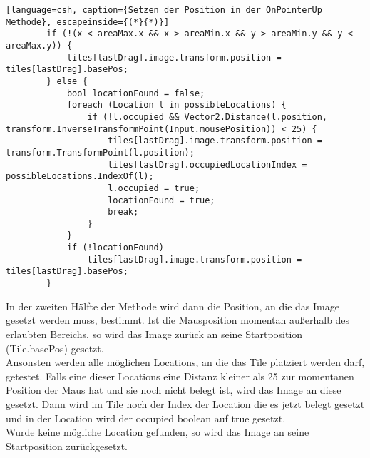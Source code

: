{\begin{lstlisting}[language=csh, caption={Setzen der Position in der OnPointerUp Methode}, escapeinside={(*}{*)}]
        if (!(x < areaMax.x && x > areaMin.x && y > areaMin.y && y < areaMax.y)) {
            tiles[lastDrag].image.transform.position = tiles[lastDrag].basePos;
        } else {
            bool locationFound = false;
            foreach (Location l in possibleLocations) {
                if (!l.occupied && Vector2.Distance(l.position, transform.InverseTransformPoint(Input.mousePosition)) < 25) {
                    tiles[lastDrag].image.transform.position = transform.TransformPoint(l.position);
                    tiles[lastDrag].occupiedLocationIndex = possibleLocations.IndexOf(l);
                    l.occupied = true;
                    locationFound = true;
                    break;
                }
            }
            if (!locationFound)
                tiles[lastDrag].image.transform.position = tiles[lastDrag].basePos;
        }
\end{lstlisting}
In der zweiten Hälfte der Methode wird dann die Position, an die das Image gesetzt werden muss, bestimmt. Ist die Mausposition momentan außerhalb des erlaubten Bereichs, so wird das Image zurück an seine Startposition (Tile.basePos) gesetzt.\\
Ansonsten werden alle möglichen Locations, an die das Tile platziert werden darf, getestet. Falls eine dieser Locations eine Distanz kleiner als 25 zur momentanen Position der Maus hat und sie noch nicht belegt ist, wird das Image an diese gesetzt. Dann wird im Tile noch der Index der Location die es jetzt belegt gesetzt und in der Location wird der occupied boolean auf true gesetzt.\\
Wurde keine mögliche Location gefunden, so wird das Image an seine Startposition zurückgesetzt.\\

}

